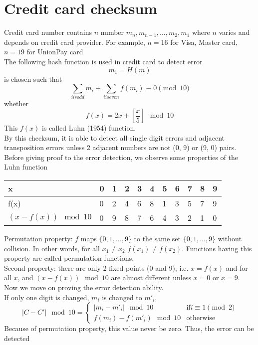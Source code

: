 \chapter{Credit card checksum}
Credit card number contains $n$ number $m_n, m_{n-1}, \ldots, m_2, m_1$ where $n$ varies and depends on credit card provider. For example, $n = 16$ for Visa, Master card, $n = 19$ for UnionPay card\\
The following hash function is used in credit card to detect error\\
$$m_1 = H(m)$$ is chosen such that
$$
\sum_{i is odd}m_i + \sum_{i is even}f(m_i) \equiv 0 \pmod{10}
$$
whether
$$
f(x) = 2x + \left[\frac{x}{5}\right] \mod 10
$$
This $f(x)$ is called Luhn (1954) function.\\
By this checksum, it is able to detect all single digit errors and adjacent transposition errors unless 2 adjacent numbers are not (0, 9) or (9, 0) pairs.\\

Before giving proof to the error detection, we observe some properties of the Luhn function\\

\begin{tabular}{| l | l | l | l | l | l | l | l | l | l | l |}
\hline
x & 0 & 1 & 2 & 3 & 4 & 5 & 6 & 7 & 8 & 9\\
\hline
f(x) & 0 & 2 & 4 & 6 & 8 & 1 & 3 & 5 & 7 & 9\\
\hline
$(x - f(x)) \mod 10$ & 0 & 9 & 8 & 7 & 6 & 4 & 3 & 2 & 1 & 0\\
\hline
\end{tabular}

Permutation property: $f$ maps $\{0,1,\ldots,9\}$ to the same set $\{0,1,\ldots,9\}$ without collision. In other words, for all $x_1 \neq x_2$ $f(x_1) \neq f(x_2)$. Functions having this property are called permutation functions.\\

Second property: there are only 2 fixed points (0 and 9), i.e. $x = f(x)$ and for all $x$, and $(x - f(x)) \mod 10$ are almost different unless $x = 0$ or $x = 9$.\\

Now we move on proving the error detection ability.\\

If only one digit is changed, $m_i$ is changed to $m'_i$,
$$
|C - C'| \mod 10 =
\begin{cases}
|m_i - m'_i| \mod 10 &\text{if} i \equiv 1 \pmod{2}
\\
f(m_i) - f(m'_i) \mod 10 &\text{otherwise}
\end{cases}
$$
Because of permutation property, this value never be zero. Thus, the error can be detected\\

